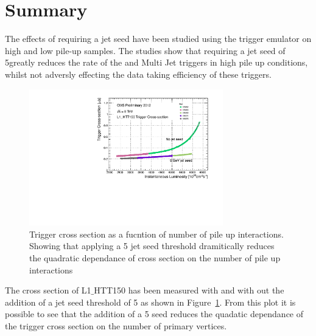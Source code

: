 
\section{Summary} %
\label{sec:Summary}
The effects of requiring a jet seed have been studied using the \Lone trigger 
emulator on high and low pile-up samples. The studies show that requiring a jet 
seed of 5\GeV greatly reduces the rate of the \HT and Multi Jet triggers in 
high pile up conditions, whilst not adversly effecting the data taking 
efficiency of these triggers.

\begin{figure}[ht]
  \centering
    \includegraphics[width=0.75\textwidth]{figures/LoneTrigger/HTT150_pileup.pdf}
  \caption{Trigger cross section as a fucntion of number of pile up 
  interactions. Showing that applying a 5 \GeV jet seed threshold dramitically 
  reduces the quadratic dependance of cross section on the number of pile up 
  interactions}
  \label{fig:figures_HTT150_pileup}
\end{figure}


The cross section of L1$\_$HTT150 has been measured with and with out the 
addition of a jet seed threshold of 5 \GeV as shown in  
Figure~\ref{fig:figures_HTT150_pileup}. From this plot it is possible to see 
that the addition of a 5 \GeV seed reduces the quadatic dependance of the 
trigger cross section on the number of primary vertices.



